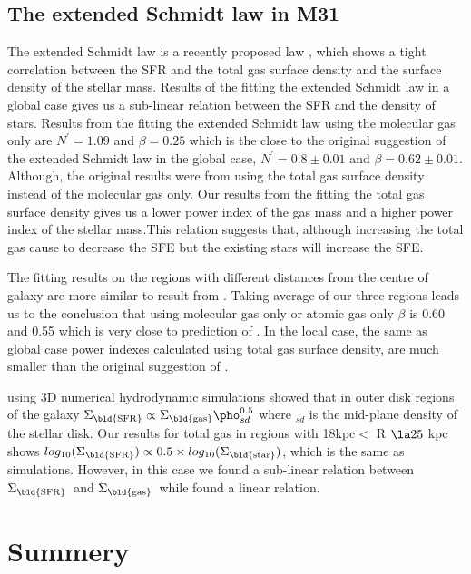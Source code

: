 \documentclass[useAMS,usenatbib]{mn2e}
\newcommand \sigmagas    {$\Sigma_{\rm \bld {gas }}$\ }
\newcommand \eqsigmagas    {\Sigma_{\rm \bld {gas }}}
\newcommand \sigmasfr     {$\Sigma_{\rm \bld {SFR }}$\ }
\newcommand \eqsigmasfr     {\Sigma_{\rm \bld {SFR }}}
\newcommand \eqsigmastar    {\Sigma_{\rm \bld {star }}}
\newcommand \eqnprime {N^\prime}
\begin{document}
\subsection{The extended Schmidt law in M31}
\label{sec:es_res}
The extended Schmidt law is a recently proposed law \citep{Shi11}, which shows a tight correlation between the SFR and the total gas surface density and the surface density of the stellar mass. Results of the fitting the extended Schmidt law in a global case gives us a sub-linear relation between the SFR and the density of stars. Results from the fitting the extended Schmidt law using the molecular gas only are $\eqnprime = 1.09$ and $\beta = 0.25$ which is the close to the original suggestion of the extended Schmidt law in the global case, $\eqnprime = 0.8 \pm 0.01$ and $\beta = 0.62\pm0.01$. Although, the original results were from using the total gas surface density instead of the molecular gas only. Our results from the fitting the total gas surface density gives us a lower power index of the gas mass and a higher power index of the stellar mass.This relation suggests that, although increasing the total gas cause to decrease the SFE but the existing stars will increase the SFE. 

 The fitting results on the regions with different distances from the centre of galaxy are more similar to result from \cite{Shi11}. Taking average of our three regions leads us to the conclusion that using molecular gas only or atomic gas only $\beta$ is 0.60 and 0.55 which is very close to prediction of \cite{Shi11}. In the local case, the same as global case power indexes calculated using total gas surface density, are much smaller than the original suggestion of \cite{Shi11}. 

 
 \cite{Kim13} using 3D numerical hydrodynamic simulations showed that in outer disk regions of the galaxy $\eqsigmasfr \propto \eqsigmagas \pho_{sd}^{0.5}$ where \pho$_{sd}$ is the mid-plane density of the stellar disk. Our results for total gas in regions with 18kpc$<$ R $\la 25$ kpc shows $log_{10}(\eqsigmasfr) \propto 0.5 \times log_{10}(\eqsigmastar)$, which is the same as simulations. However, in this case we found a sub-linear relation between \sigmasfr and \sigmagas while \cite{Kim13} found a linear relation. 




\section{Summery}
\end{document}
